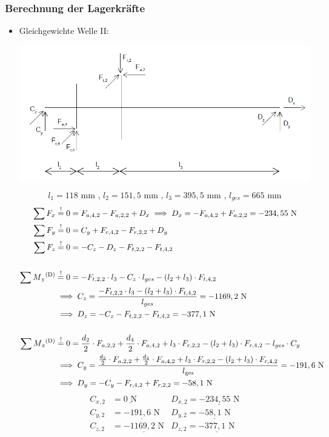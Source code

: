 \subsubsection{Berechnung der Lagerkräfte}
\begin{itemize}
	\item Gleichgewichte Welle II:
	\begin{center}
		\includegraphics[width=1.04\textwidth,keepaspectratio]{figures/Gang2.png}
	\end{center}
\[l_{1} =118\text{ mm} \text{ , } l_{2} = 151,5\text{ mm} \text{ , } l_{3} = 395,5\text{ mm}  \text{ , } l_{ges} = 665\text{ mm}\]
	\begin{align*}
	\sum F_x &\overset{!}{=} 0 = F_{a,4,2} -F_{a,2,2} + D_x \implies D_x = -F_{a,4,2} +F_{a,2,2}= -234,55 \text{ N} \\
	\sum F_y &\overset{!}{=} 0 = C_y +F_{r,4,2}- F_{r,2,2}+D_y \\ 
	\sum F_z &\overset{!}{=} 0 = - C_z - D_z - F_{t,2,2} - F_{t,4,2} \\ \\
	\sum M\textsubscript{y}\textsuperscript{(D)} &\overset{!}{=} 0 = - F_{t,2,2} \cdot l_3 - C_z \cdot l_{ges} -(l_2 + l_3) \cdot F_{t,4,2} \\ 
	&\implies C_z = \frac{- F_{t,2,2} \cdot l_3 - (l_2+l_3) \cdot F_{t,4,2} }{l_{ges}} = -1169,2 \text { N} \\ 
	& \implies D_z = - C_z - F_{t,2,2} - F_{t,4,2}= -377,1 \text{ N}\\ \\
	\sum M\textsubscript{z}\textsuperscript{(D)} &\overset{!}{=} 0 = \frac{d_2}{2} \cdot F_{a,2,2} + \frac{d_4}{2} \cdot F_{a,4,2} + l_3 \cdot F_{r,2,2} - (l_2 + l_3) \cdot F_{r,4,2}- l_{ges} \cdot C_y  \\ 
	&\implies C_y = \frac{ \frac{d_2}{2} \cdot F_{a,2,2} + \frac{d_4}{2} \cdot F_{a,4,2}  + l_3 \cdot F_{r,2,2} - (l_2 + l_3) \cdot F_{r,4,2}}{l\textsubscript{ges}} = -191,6 \text{ N}\\ 
	& \implies D_y =  - C_y - F_{r,4,2} + F_{r,2,2} = -58,1\text{ N}
	\end{align*}
	\begin{align*}
	C_{x,2} &= \underline{0\text{ N}} & D_{x,2}= \underline{-234,55\text{ N}}\\
	C_{y,2} &= \underline{-191,6\text{ N}} & D_{y,2}= \underline{-58,1\text{ N}}\\
	C_{z,2} &= \underline{-1169,2\text{ N}} & D_{z,2}= \underline{-377,1\text{ N}}
	\end{align*}
\end{itemize}
